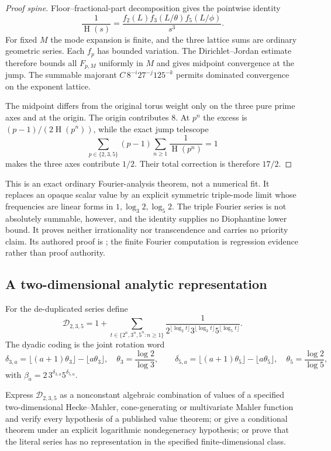 \documentclass[11pt]{article}
\newcommand{\hgt}{\operatorname{H}}
\begin{document}
\begin{proof}[Proof spine]
Floor--fractional-part decomposition gives the pointwise identity
\[
 \frac1{\hgt(s)}=
 \frac{f_2(L)f_3(L/\theta)f_5(L/\phi)}{s^3}.
\]
For fixed $M$ the mode expansion is finite, and the three lattice sums are
ordinary geometric series.  Each $f_p$ has bounded variation.  The
Dirichlet--Jordan estimate therefore bounds all $F_{p,M}$ uniformly in $M$
and gives midpoint convergence at the jump.  The summable majorant
$C\,8^{-i}27^{-j}125^{-k}$ permits dominated convergence on the exponent
lattice.

The midpoint differs from the original torus weight only on the three pure
prime axes and at the origin.  The origin contributes $8$.  At $p^n$ the
excess is $(p-1)/(2\hgt(p^n))$, while the exact jump telescope
\[
 \sum_{p\in\{2,3,5\}}(p-1)
       \sum_{n\ge1}\frac1{\hgt(p^n)}=1
\]
makes the three axes contribute $1/2$.  Their total correction is therefore
$17/2$.
\end{proof}

This is an exact ordinary Fourier-analysis theorem, not a numerical fit.
It replaces an opaque scalar value by an explicit symmetric triple-mode
limit whose frequencies are linear forms in $1,\log_3 2,\log_5 2$.
The triple Fourier series is not absolutely summable, however, and the
identity supplies no Diophantine lower bound.  It proves neither irrationality
nor transcendence and carries no priority claim.  Its authored proof is
; the finite
Fourier computation is regression evidence rather than proof authority.

\subsection{A two-dimensional analytic representation}

For the de-duplicated series define
\[
 \mathcal D_{2,3,5}=1+
 \sum_{t\in\{2^n,3^n,5^n:n\ge1\}}
 \frac{1}{
   2^{\lfloor\log_2t\rfloor}
   3^{\lfloor\log_3t\rfloor}
   5^{\lfloor\log_5t\rfloor}}.
\]
The dyadic coding is the joint rotation word
\[
 \delta_{3,a}=\lfloor(a+1)\theta_3\rfloor-\lfloor a\theta_3\rfloor,
 \quad \theta_3=\frac{\log2}{\log3},\qquad
 \delta_{5,a}=\lfloor(a+1)\theta_5\rfloor-\lfloor a\theta_5\rfloor,
 \quad \theta_5=\frac{\log2}{\log5},
\]
with $\beta_a=2\,3^{\delta_{3,a}}5^{\delta_{5,a}}$.

\begin{problem}
Express $\mathcal D_{2,3,5}$ as a nonconstant algebraic combination of values
of a specified two-dimensional Hecke--Mahler, cone-generating or multivariate
Mahler function and verify every hypothesis of a published value theorem; or
give a conditional theorem under an explicit logarithmic nondegeneracy
hypothesis; or prove that the literal series has no representation in the
specified finite-dimensional class.
\end{problem}
\end{document}
